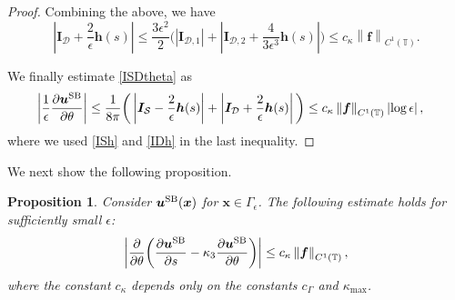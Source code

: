 \documentclass[11pt]{article}
\numberwithin{equation}{section}
\newcommand{\T}{\mathbb{T}}
\newcommand{\bu}{\bm{u}}
\newcommand{\bx}{\bm{x}}
\newcommand{\p}{\partial}
\newcommand{\SB}{{\rm SB}}
\newcommand{\abs}[1]{\left\lvert #1 \right\rvert}
\newcommand{\norm}[1]{\left\lVert #1 \right\rVert}
\newcommand{\mc}[1]{\mathcal{#1}}
\newtheorem{proposition}[theorem]{Proposition}
\theoremstyle{definition}
\begin{document}
\begin{proof}
Combining the above, we have
\begin{equation}\label{IDh}
\abs{\bm{I}_{\mc{D}}+\frac{2}{\epsilon}\bm{h}(s)}\le \frac{3\epsilon^2}{2}\bigg(\abs{\bm{I}_{\mc{D},1}}+\abs{\bm{I}_{\mc{D},2}+\frac{4}{3\epsilon^3}\bm{h}(s)}\bigg) \le c_\kappa\norm{\bm{f}}_{C^1(\T)}.
\end{equation}

We finally estimate \eqref{ISDtheta} as 
\begin{align*}
\abs{\frac{1}{\epsilon}\frac{\p\bu^{\SB}}{\p \theta}}&\le \frac{1}{8\pi}\bigg(\abs{\bm{I}_{\mc{S}} -\frac{2}{\epsilon}\bm{h}(s)}+\abs{\bm{I}_{\mc{D}}+\frac{2}{\epsilon}\bm{h}(s)} \bigg) \le c_\kappa\norm{\bm{f}}_{C^1(\T)}\abs{\log \epsilon},
\end{align*}
where we used \eqref{ISh} and \eqref{IDh} in the last inequality.
\end{proof}

We next show the following proposition.
\begin{proposition}\label{prop:uSBstheta}
Consider $\bu^{\SB}(\bx)$ for $\bx\in \Gamma_\epsilon$. The following estimate holds for sufficiently small $\epsilon$:
\begin{equation}
\abs{\frac{\p}{\p\theta}\bigg(\frac{\p\bu^{\SB}}{\p s} - \kappa_3\frac{\p\bu^{\SB}}{\p\theta} \bigg)}\le c_\kappa\norm{\bm{f}}_{C^1(\T)},
\end{equation}
where the constant $c_\kappa$ depends only on the constants $c_\Gamma$ and $\kappa_{\max}$.
\end{proposition}
\end{document}
